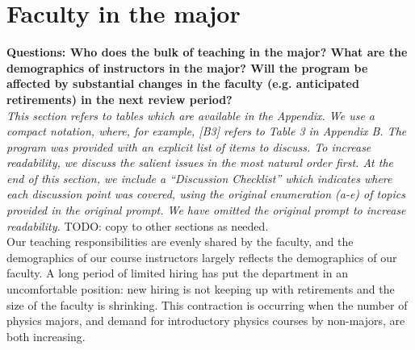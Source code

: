 \documentclass[12pt]{article}
\begin{document}
\newpage
\section{Faculty in the major}
\label{sec:faculty}

{\bf Questions: Who does the bulk of teaching in the major? What are
  the demographics of instructors in the major? Will the program be
  affected by substantial changes in the faculty (e.g. anticipated
  retirements) in the next review period?}\\[3pt]


\noindent
{\it This section refers to tables which are available in the Appendix.  We
use a compact notation, where, for example, [B3] refers to Table 3 in
Appendix B.  The program was provided with an explicit list of items
to discuss.  To increase readability, we discuss the salient issues in
the most natural order first.  At the end of this section, we include a
``Discussion Checklist'' which indicates where each discussion point
was covered, using the original enumeration (a-e) of topics provided
in the original prompt. We have omitted the original prompt to
increase readability.}  {\color{red} TODO: copy to other sections as
      needed}.\\[3pt]

\noindent
Our teaching responsibilities are evenly shared by the faculty, and
the demographics of our course instructors largely reflects the
demographics of our faculty.  A long period of limited hiring has put
the department in an uncomfortable position: new hiring is not
keeping up with retirements and the size of the faculty is shrinking.
This contraction is occurring when the number of physics majors, and
demand for introductory physics courses by non-majors, are both
increasing.\\[3pt]
\end{document}
